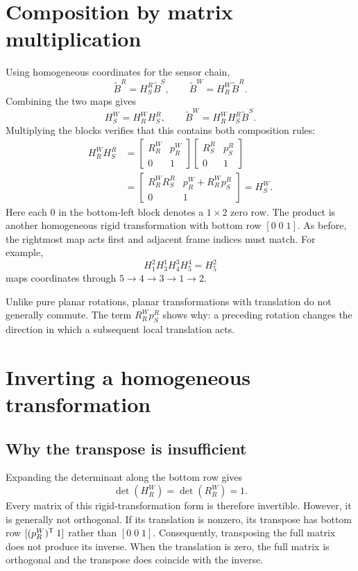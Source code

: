\section{Composition by matrix multiplication}
Using homogeneous coordinates for the sensor chain,
\[
 \widetilde B^R=H_S^R\widetilde B^S,\qquad
 \widetilde B^W=H_R^W\widetilde B^R.
\]
Combining the two maps gives
\begin{equation}
 \boxed{H_S^W=H_R^W H_S^R,\qquad
 \widetilde B^W=H_R^W H_S^R\widetilde B^S.}
\end{equation}
Multiplying the blocks verifies that this contains both composition rules:
\begin{align}
 H_R^W H_S^R
 &=\begin{bmatrix}R_R^W&p_R^W\\0&1\end{bmatrix}
   \begin{bmatrix}R_S^R&p_S^R\\0&1\end{bmatrix}\\
 &=\begin{bmatrix}
 R_R^W R_S^R&p_R^W+R_R^W p_S^R\\0&1
 \end{bmatrix}=H_S^W.
\end{align}
Here each $0$ in the bottom-left block denotes a $1\times2$ zero row.
The product is another homogeneous rigid transformation with bottom row
$[0\;0\;1]$. As before, the rightmost map acts first and adjacent frame
indices must match. For example,
\[
 H_1^2 H_3^1 H_4^3 H_5^4=H_5^2
\]
maps coordinates through $5\to4\to3\to1\to2$.

Unlike pure planar rotations, planar transformations with translation do not
generally commute. The term $R_R^W p_S^R$ shows why: a preceding rotation
changes the direction in which a subsequent local translation acts.

\section{Inverting a homogeneous transformation}
\subsection{Why the transpose is insufficient}
Expanding the determinant along the bottom row gives
\[
 \det(H_R^W)=\det(R_R^W)=1.
\]
Every matrix of this rigid-transformation form is therefore invertible.
However, it is generally not orthogonal. If its translation is nonzero, its
transpose has bottom row $[(p_R^W)^{\mathsf T}\;1]$ rather than $[0\;0\;1]$.
Consequently, transposing the full matrix does not produce its inverse.
When the translation is zero, the full matrix is orthogonal and the transpose
does coincide with the inverse.


